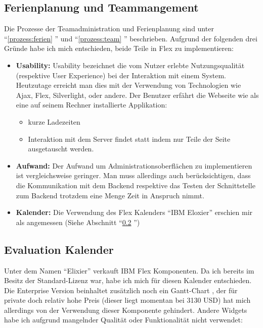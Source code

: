 \subsection{Ferienplanung und Teammangement}\label{implementation:ferienplanung}
Die Prozesse der Teamadministration und Ferienplanung sind unter ``\ref{prozess:ferien} '' und  ``\ref{prozess:team} '' beschrieben. Aufgrund der folgenden drei Gr\"unde habe ich mich entschieden, beide Teile in Flex zu implementieren:
\begin{itemize}
\item \textbf{Usability: } Usability bezeichnet die vom Nutzer erlebte Nutzungsqualit\"at (respektive User Experience) bei der Interaktion mit einem System\cite{wiki:usability}. Heutzutage erreicht man dies mit der Verwendung von Technologien wie Ajax, Flex, Silverlight, oder andere. Der Benutzer erf\"ahrt die Webseite wie als eine auf seinem Rechner installierte Applikation:
\begin{itemize}
\item kurze Ladezeiten
\item Interaktion mit dem Server findet statt indem nur Teile der Seite ausgetauscht werden.
\end{itemize}
\item \textbf{Aufwand: }Der Aufwand um Administrationsoberfl\"achen zu implementieren ist vergleichsweise geringer. Man muss allerdings auch ber\"ucksichtigen, dass die Kommunikation mit dem Backend respektive das Testen der Schnittstelle zum Backend trotzdem eine Menge Zeit in Anspruch nimmt.
\item \textbf{Kalender: } Die Verwendung des Flex Kalenders ``IBM Eloxier'' erschien mir als angemessen (Siehe Abschnitt ``\ref{evaluation:kalender} '')
\end{itemize}

\subsection{Evaluation Kalender}\label{evaluation:kalender}
Unter dem Namen ``Elixier'' verkauft IBM Flex Komponenten. Da ich bereits im Besitz der Standard-Lizenz war, habe ich mich f\"ur diesen Kalender entschieden. Die Enterprise Version beinhaltet zus\"atzlich noch ein Gantt-Chart \cite{wiki:gantt}, der f\"ur private doch relativ hohe Preis (dieser liegt momentan bei 3130 USD) hat mich allerdings von der Verwendung dieser Komponente gehindert.  Andere Widgets habe ich aufgrund mangelnder Qualit\"at oder Funktionalit\"at nicht verwendet:

